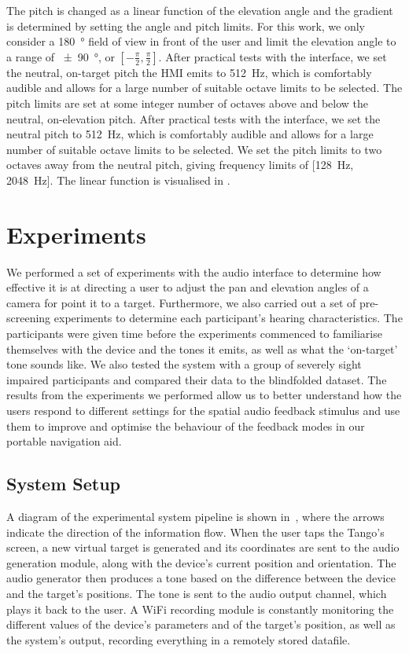\documentclass[]{interact}
\begin{document}
The pitch is changed as a linear function of the elevation angle and the gradient is determined by setting the angle and pitch limits.
For this work, we only consider a \SI{180}{\degree} field of view in front of the user and limit the elevation angle to a range of \SI{\pm90}{\degree}, or $[-\frac{\pi}{2}, \frac{\pi}{2}]$.
After practical tests with the interface, we set the neutral, on-target pitch the HMI emits to \SI{512}{\hertz}, which is comfortably audible and allows for a large number of suitable octave limits to be selected.
The pitch limits are set at some integer number of octaves above and below the neutral, on-elevation pitch.
After practical tests with the interface, we set the neutral pitch to \SI{512}{\hertz}, which is comfortably audible and allows for a large number of suitable octave limits to be selected.
We set the pitch limits to two octaves away from the neutral pitch, giving frequency limits of [\SI{128}{\hertz}, \SI{2048}{\hertz}].
The linear function is visualised in .

\section{Experiments}\label{sec:experiments}

We performed a set of experiments with the audio interface to determine how effective it is at directing a user to adjust the pan and elevation angles of a camera for point it to a target.
Furthermore, we also carried out a set of pre-screening experiments to determine each participant's hearing characteristics.
The participants were given time before the experiments commenced to familiarise themselves with the device and the tones it emits, as well as what the `on-target' tone sounds like.
We also tested the system with a group of severely sight impaired participants and compared their data to the blindfolded dataset.
The results from the experiments we performed allow us to better understand how the users respond to different settings for the spatial audio feedback stimulus and use them to improve and optimise the behaviour of the feedback modes in our portable navigation aid.

\subsection{System Setup}

A diagram of the experimental system pipeline is shown in~, where the arrows indicate the direction of the information flow.
When the user taps the Tango's screen, a new virtual target is generated and its coordinates are sent to the audio generation module, along with the device's current position and orientation.
The audio generator then produces a tone based on the difference between the device and the target's positions. The tone is sent to the audio output channel, which plays it back to the user.
A WiFi recording module is constantly monitoring the different values of the device's parameters and of the target's position, as well as the system's output, recording everything in a remotely stored datafile. 
\end{document}
